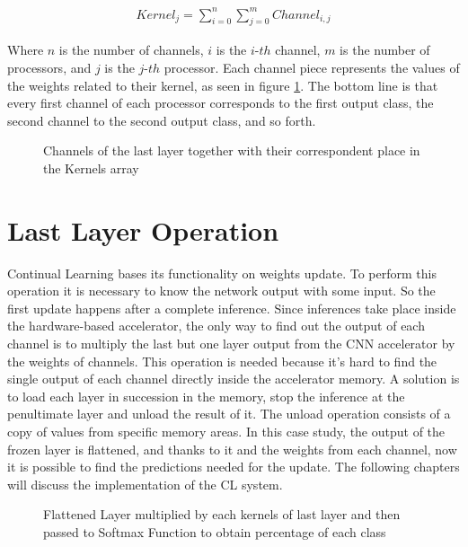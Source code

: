 \begin{gather*}
    Kernel_j = \sum_{i=0}^{n}\sum_{j=0}^{m} Channel_{i,j}
\end{gather*}

\quad Where $n$ is the number of channels, $i$ is the $i$-$th$ channel, $m$ is the number of processors, and $j$ is the $j$-$th$ processor. 
Each channel piece represents the values of the weights related to their kernel, as seen in figure \ref{weights_allocation}. The bottom line is that every first channel of each processor corresponds to the first output class, the second channel to the second output class, and so forth. 

\begin{figure}[!ht]
\centerline{}
\caption{Channels of the last layer together with their correspondent place in the Kernels array}
\label{weights_allocation}
\end{figure}

\section{Last Layer Operation}
\label{sec:last_layer_operation}
\quad Continual Learning bases its functionality on weights update. To perform this operation it is necessary to know the network output with some input. So the first update happens after a complete inference. Since inferences take place inside the hardware-based accelerator, the only way to find out the output of each channel is to multiply the last but one layer output from the CNN accelerator by the weights of channels. This operation is needed because it's hard to find the single output of each channel directly inside the accelerator memory. A solution is to load each layer in succession in the memory, stop the inference at the penultimate layer and unload the result of it. The unload operation consists of a copy of values from specific memory areas. In this case study, the output of the frozen layer is flattened, and thanks to it and the weights from each channel, now it is possible to find the predictions needed for the update. The following chapters will discuss the implementation of the CL system. 

\begin{figure}[!ht]
\centerline{}
\caption{Flattened Layer multiplied by each kernels of last layer and then passed to Softmax Function to obtain percentage of each class}
\label{last_layer_per_weights}
\end{figure}

